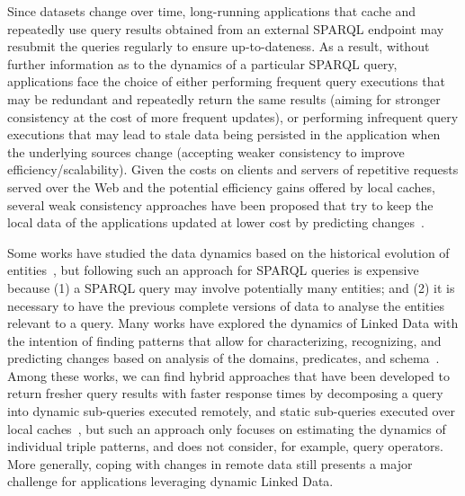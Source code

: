 \documentclass[runningheads]{llncs}
\begin{document}
Since datasets change over time, long-running applications that cache and repeatedly use query results obtained from an external SPARQL endpoint may resubmit the queries regularly to ensure up-to-dateness. As a result, without further information as to the dynamics of a particular SPARQL query, applications face the choice of either performing frequent query executions that may be redundant and repeatedly return the same results (aiming for stronger consistency at the cost of more frequent updates), or performing infrequent query executions that may lead to stale data being persisted in the application when the underlying sources change (accepting weaker consistency to improve efficiency/scalability). Given the costs on clients and servers of repetitive requests served over the Web  and the potential efficiency gains offered by local caches, several weak consistency approaches have been proposed that try to keep the local data of the applications updated at lower cost by predicting changes~\cite{KnuthHS16,DividinoGS15,NishiokaS17}.

Some works have studied the data dynamics based on the historical evolution of entities~\cite{KaferAUOH13,DividinoGSG14,NishiokaS15}, but following such an approach for SPARQL queries is expensive because (1) a SPARQL query may involve potentially many entities; and (2) it is necessary to have the previous complete versions of data to analyse the entities relevant to a query. Many works have explored the dynamics of Linked Data with the intention of finding patterns that allow for characterizing, recognizing, and predicting changes based on analysis of the domains, predicates, and schema~\cite{UmbrichHHPD10,KaferAUOH13,NishiokaS16,NishiokaS17,GonzalezH18}. Among these works, we can find hybrid approaches that have been developed to return fresher query results with faster response times by decomposing a query into dynamic sub-queries executed remotely, and static sub-queries executed over local caches~\cite{UmbrichKHP12}, but such an approach only focuses on estimating the dynamics of individual triple patterns, and does not consider, for example, query operators. More generally, coping with changes in remote data still presents a major challenge for applications leveraging dynamic Linked Data.
\end{document}
